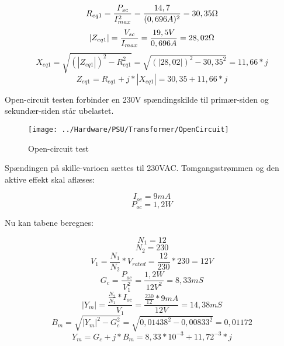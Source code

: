 \begin{equation}
	R_{eq1} = \frac{P_{sc}}{I_{max}^2} = \frac{14,7}{(0,696A)^2} = 30,35\ohm
\end{equation}
\begin{equation}
	\left|Z_{eq1}\right| = \frac{V_{sc}}{I_{max}} = \frac{19,5V}{0,696A} = 28,02\ohm
\end{equation}
\begin{equation}
	X_{eq1} = \sqrt{\left(\left|Z_{eq1}\right|\right)^2 - R_{eq1}^2} = \sqrt{\left(\left|28,02\right|\right)^2 - 30,35^2} = 11,66 * j
\end{equation}
\begin{equation}
	Z_{eq1} = R_{eq1} + j * \left|X_{eq1}\right| = 30,35 + 11,66 * j
\end{equation}

Open-circuit testen forbinder en 230V spændingskilde til primær-siden og sekundær-siden står ubelastet.

\begin{figure}[H]
	\centering
	\texttt{[image: ../Hardware/PSU/Transformer/OpenCircuit]}
	\caption{Open-circuit test}
	\label{photo:OpenCircuit}
\end{figure}


Spændingen på skille-varioen sættes til 230VAC. Tomgangsstrømmen og den aktive effekt skal aflæses:

\begin{equation}
	I_{oc} = 9mA
\end{equation}
\begin{equation}
	P_{oc} = 1,2W
\end{equation}

Nu kan tabene beregnes:

\begin{equation}
	N_1 = 12
\end{equation}
\begin{equation}
	N_2 = 230
\end{equation}
\begin{equation}
	V_1 = \frac{N_1}{N_2} * V_{rated} = \frac{12}{230} * 230 = 12V
\end{equation}
\begin{equation}
	G_c = \frac{P_{oc}}{V_1^2} = \frac{1,2W}{12V^2} = 8,33mS
\end{equation}
\begin{equation}
	\left|Y_m\right| = \frac{\frac{N_2}{N_1} * I_{oc}}{V_1} = \frac{\frac{230}{12} * 9mA}{12V} = 14,38mS
\end{equation}
\begin{equation}
	B_m = \sqrt{\left|Y_m\right|^2 - G_c^2} = \sqrt{0,01438^2 - 0,00833^2} = 0,01172
\end{equation}
\begin{equation}
	Y_m = G_c + j * B_m = 8,33*10^{-3} + 11,72^{-3} * j
\end{equation}


